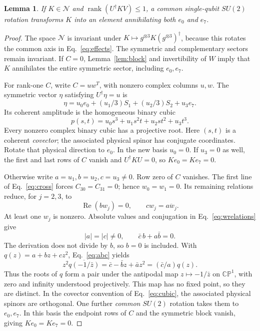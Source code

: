 \documentclass[aps,pra,reprint,onecolumn,superscriptaddress]{revtex4-2}
\newcommand{\NN}{\mathcal N}
\newcommand{\rank}{\operatorname{rank}}
\newtheorem{lemma}{Lemma}
\begin{document}
\begin{lemma}\label{lem:antipodes}
If \(K\in\NN\) and \(\rank(U^\dagger K V)\le1\), a common single-qubit \(SU(2)\) rotation transforms \(K\) into an element annihilating both \(e_0\) and \(e_7\).
\end{lemma}
\begin{proof}
The space \(\NN\) is invariant under \(K\mapsto g^{\otimes3}K(g^{\otimes3})^\dagger\), because this rotates the common axis in Eq.~\eqref{eq:effects}. The symmetric and complementary sectors remain invariant. If \(C=0\), Lemma~\ref{lem:block} and invertibility of \(W\) imply that \(K\) annihilates the entire symmetric sector, including \(e_0,e_7\).

For rank-one \(C\), write \(C=uw^T\), with nonzero complex columns \(u,w\). The symmetric vector \(\eta\) satisfying \(U^\dagger\eta=u\) is
\[
 \eta=u_0e_0+(u_1/3)S_1+(u_2/3)S_2+u_3e_7.
\]
Its coherent amplitude is the homogeneous binary cubic
\begin{equation}
 p(s,t)=u_0s^3+u_1s^2t+u_2st^2+u_3t^3.
 \label{eq:cubic}
\end{equation}
Every nonzero complex binary cubic has a projective root. Here \((s,t)\) is a coherent \emph{covector}; the associated physical spinor has conjugate coordinates. Rotate that physical direction to \(e_0\). In the new basis \(u_0=0\). If \(u_3=0\) as well, the first and last rows of \(C\) vanish and \(U^\dagger K U=0\), so \(K e_0=K e_7=0\).

Otherwise write \(a=u_1,b=u_2,c=u_3\ne0\). Row zero of \(C\) vanishes. The first line of Eq.~\eqref{eq:cross} forces \(C_{30}=C_{31}=0\); hence \(w_0=w_1=0\). Its remaining relations reduce, for \(j=2,3\), to
\begin{equation}
 \operatorname{Re}(bw_j)=0,\qquad cw_j=\overline{aw_j}.
 \label{eq:wrelations}
\end{equation}
At least one \(w_j\) is nonzero. Absolute values and conjugation in Eq.~\eqref{eq:wrelations} give
\begin{equation}
 |a|=|c|\ne0,\qquad \bar c\,b+a\bar b=0.
 \label{eq:abc}
\end{equation}
The derivation does not divide by \(b\), so \(b=0\) is included. With \(q(z)=a+bz+cz^2\), Eq.~\eqref{eq:abc} yields
\begin{equation}
 z^2\overline{q(-1/\bar z)}
 =\bar c-\bar b z+\bar a z^2
 =(\bar c/a)q(z).
 \label{eq:sharp}
\end{equation}
Thus the roots of \(q\) form a pair under the antipodal map \(z\mapsto-1/\bar z\) on \(\mathbb{CP}^1\), with zero and infinity understood projectively. This map has no fixed point, so they are distinct. In the covector convention of Eq.~\eqref{eq:cubic}, the associated physical spinors are orthogonal. One further \emph{common} \(SU(2)\) rotation takes them to \(e_0,e_7\). In this basis the endpoint rows of \(C\) and the symmetric block vanish, giving \(K e_0=K e_7=0\).
\end{proof}
\end{document}
